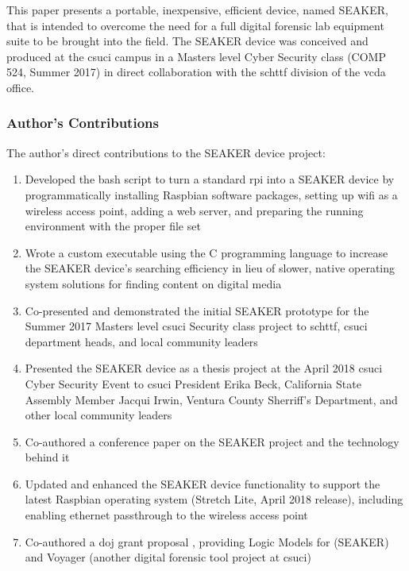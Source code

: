 \documentclass[12pt]{article}
\begin{document}
This paper presents a portable, inexpensive, efficient device, named SEAKER,
that is intended to overcome the need for a full digital
forensic lab equipment suite to be brought into the field.  The SEAKER device was conceived and 
produced at the \gls{csuci} campus in a 
Masters level Cyber Security class (COMP 524, Summer 2017) in direct collaboration with the
\gls{schttf} division of the \gls{vcda} office.\\


\subsubsection{Author's Contributions}
The author's direct contributions to the SEAKER device project:
\begin{enumerate}
  \item Developed the bash script to turn a standard \gls{rpi} into a
  SEAKER device by programmatically
  installing Raspbian software packages, setting up \gls{wifi} as a wireless access point, adding a web server,
  and preparing the running environment with the proper file set
  \item Wrote a custom executable using the C programming language to increase the SEAKER device's 
  searching efficiency in lieu of slower, native operating
  system solutions for finding content on digital media
  \item Co-presented and demonstrated the initial SEAKER prototype for the Summer 2017 Masters level \gls{csuci}
  Security class project to \gls{schttf}, \gls{csuci} department heads, and local community leaders
  \item Presented the SEAKER device as a thesis project at the April 2018 \gls{csuci} Cyber Security Event
  to \gls{csuci} President
  Erika Beck, California State Assembly Member Jacqui Irwin, Ventura County Sherriff's Department,
  and other local community leaders
  \item Co-authored a conference paper \cite{gentry2018seaker} on the SEAKER project and the technology behind it
  \item Updated and enhanced the SEAKER device functionality to support the latest Raspbian operating system (Stretch
  Lite, April 2018 release), including enabling ethernet passthrough to the wireless access point
  \item Co-authored a \gls{doj} grant proposal \cite{soltys2018dojgrant}, providing Logic Models
  for (SEAKER) and Voyager (another digital forensic tool project at \gls{csuci})
\end{enumerate}
\end{document}
